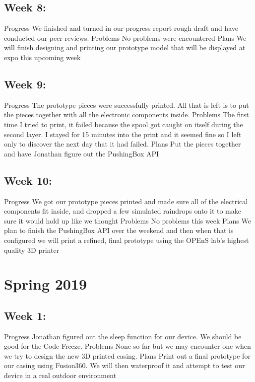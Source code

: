 \documentclass[letterpaper,10pt,draftclsnofoot,onecolumn]{article}
\begin{document}
\subsection{Week 8:}
Progress
We finished and turned in our progress report rough draft and have conducted our peer reviews.
\newline
Problems
No problems were encountered
\newline
Plans
We will finish designing and printing our prototype model that will be displayed at expo this upcoming week
 
\subsection{Week 9:}
Progress
The prototype pieces were successfully printed. All that is left is to put the pieces together with all the electronic components inside. 
\newline
Problems
The first time I tried to print, it failed because the spool got caught on itself during the second layer. I stayed for 15 minutes into the print and it seemed fine so I left only to discover the next day that it had failed.
\newline
Plans
Put the pieces together and have Jonathan figure out the PushingBox API
 
\subsection{Week 10:}
Progress
We got our prototype pieces printed and made sure all of the electrical components fit inside, and dropped a few simulated raindrops onto it to make sure it would hold up like we thought
\newline 
Problems
No problems this week
\newline
Plans
We plan to finish the PushingBox API over the weekend and then when that is configured we will print a refined, final prototype using the OPEnS lab's highest quality 3D printer
 
\section{Spring 2019}
\subsection{Week 1:}
Progress 
Jonathan figured out the sleep function for our device. We should be good for the Code Freeze.
\newline
Problems
None so far but we may encounter one when we try to design the new 3D printed casing.
\newline
Plans
Print out a final prototype for our casing using Fusion360. We will then waterproof it and attempt to test our device in a real outdoor environment
\end{document}
